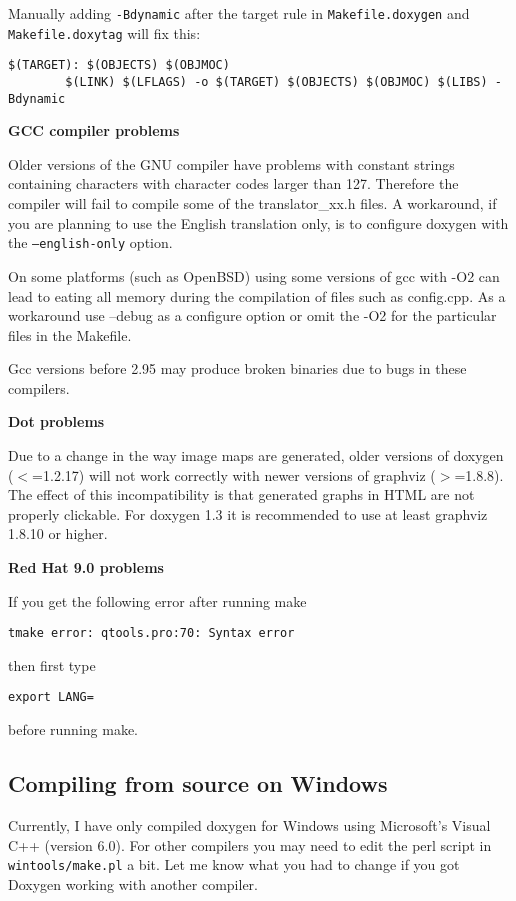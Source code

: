 Manually adding {\tt -Bdynamic} after the target rule in {\tt Makefile.doxygen} and {\tt Makefile.doxytag} will fix this:



\footnotesize\begin{verbatim}
$(TARGET): $(OBJECTS) $(OBJMOC) 
        $(LINK) $(LFLAGS) -o $(TARGET) $(OBJECTS) $(OBJMOC) $(LIBS) -Bdynamic
\end{verbatim}
\normalsize


{\bf GCC compiler problems}

Older versions of the GNU compiler have problems with constant strings containing characters with character codes larger than 127. Therefore the compiler will fail to compile some of the translator\_\-xx.h files. A workaround, if you are planning to use the English translation only, is to configure doxygen with the {\tt --english-only} option.

On some platforms (such as Open\-BSD) using some versions of gcc with -O2 can lead to eating all memory during the compilation of files such as config.cpp. As a workaround use --debug as a configure option or omit the -O2 for the particular files in the Makefile.

Gcc versions before 2.95 may produce broken binaries due to bugs in these compilers.

{\bf Dot problems}

Due to a change in the way image maps are generated, older versions of doxygen ($<$=1.2.17) will not work correctly with newer versions of graphviz ($>$=1.8.8). The effect of this incompatibility is that generated graphs in HTML are not properly clickable. For doxygen 1.3 it is recommended to use at least graphviz 1.8.10 or higher.

{\bf Red Hat 9.0 problems}

If you get the following error after running make 

\footnotesize\begin{verbatim}
tmake error: qtools.pro:70: Syntax error
\end{verbatim}
\normalsize
then first type 

\footnotesize\begin{verbatim}
export LANG=
\end{verbatim}
\normalsize
before running make.\subsection{Compiling from source on Windows}\label{install_install_src_windows}
Currently, I have only compiled doxygen for Windows using Microsoft's Visual C++ (version 6.0). For other compilers you may need to edit the perl script in {\tt wintools/make.pl} a bit. Let me know what you had to change if you got Doxygen working with another compiler.

